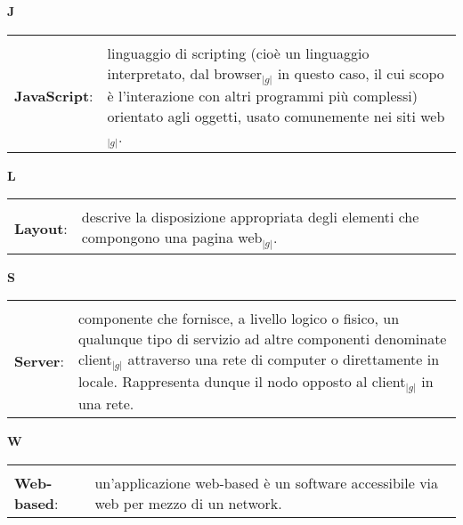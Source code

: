 \hfill\Huge{\textbf{J}}\\	
\normalsize
	\begin{longtable}{p{} p{}} 
	    \toprule
	    \\	
  \textbf{JavaScript}:	&	linguaggio di scripting (cioè un linguaggio interpretato, dal browser$_{|g|}$ in questo caso, il cui scopo è l’interazione con altri programmi più complessi) orientato agli oggetti, usato comunemente nei siti web$_{|g|}$.\\	
\end{longtable}	
	
	\hfill\Huge{\textbf{L}}\\	
\normalsize
	\begin{longtable}{p{} p{}} 
	    \toprule
	    \\
		    \textbf{Layout}:		&	descrive la disposizione appropriata degli elementi che compongono una pagina web$_{|g|}$.\\
	\end{longtable}	
	
	\hfill\Huge{\textbf{S}}\\	
\normalsize
	\begin{longtable}{p{} p{}} 
	    \toprule
	    \\
	    \textbf{Server}:			&	componente che fornisce, a livello logico o fisico, un qualunque tipo di servizio ad altre componenti denominate client$_{|g|}$ attraverso una rete di computer o direttamente in locale. Rappresenta 
							dunque il nodo opposto al client$_{|g|}$ in una rete.\\
	\end{longtable}	
	\hfill\Huge{\textbf{W}}\\	
\normalsize
	\begin{longtable}{p{} p{}} 
	    \toprule
	    \\
	\textbf{Web-based}: & 	
	un'applicazione web-based è un software accessibile via web per mezzo di un network.
	\end{longtable}

